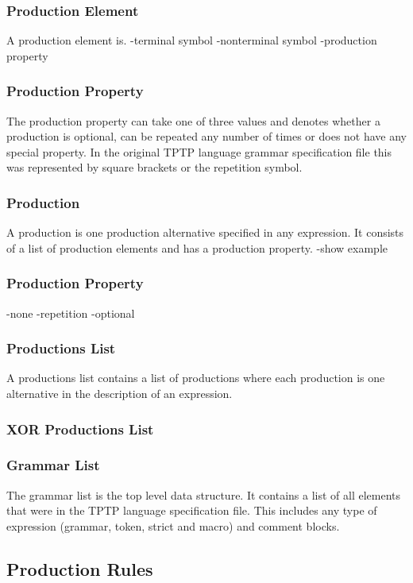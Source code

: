 \subsubsection{Production Element}
A production element is.
-terminal symbol
-nonterminal symbol
-production property
\subsubsection{Production Property}
The production property can take one of three values and denotes whether a production is optional, can be repeated any number of times or does not have any special property. In the original \ac{TPTP} language grammar specification file this was represented by square brackets or the repetition symbol.


\subsubsection{Production}
A production is one production alternative specified in any expression. It consists of a list of production elements and has a production property.
-show example
\subsubsection{Production Property}
-none
-repetition
-optional
\subsubsection{Productions List}
A productions list contains a list of productions where each production is one alternative in the description of an expression.
\subsubsection{XOR Productions List}


\subsubsection{Grammar List}
The grammar list is the top level data structure. It contains a list of all elements that were in the \ac{TPTP} language specification file. This includes any type of expression (grammar, token, strict and macro) and comment blocks.

\subsection{Production Rules}


